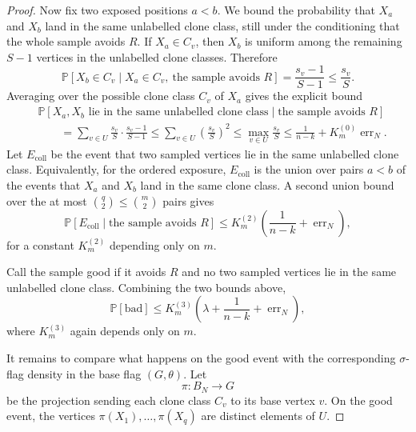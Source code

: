 \documentclass[11pt]{article}
\theoremstyle{definition}
\newcommand{\Prob}{\mathbb{P}}
\begin{document}
\begin{proof}
Now fix two exposed positions $a<b$.  We bound the probability that $X_a$ and
$X_b$ land in the same unlabelled clone class, still under the conditioning
that the whole sample avoids $R$.  If $X_a\in C_v$, then $X_b$ is uniform among
the remaining $S-1$ vertices in the unlabelled clone classes.  Therefore
\[
  \Prob[X_b\in C_v\mid X_a\in C_v,\ \text{the sample avoids }R]
  =
  \frac{s_v-1}{S-1}
  \le
  \frac{s_v}{S}.
\]
Averaging over the possible clone class $C_v$ of $X_a$ gives the explicit bound
\[
  \begin{aligned}
  &\Prob[X_a,X_b\text{ lie in the same unlabelled clone class}
        \mid \text{the sample avoids }R]  \\
  &\qquad =
  \sum_{v\in U}
    \frac{s_v}{S}\cdot\frac{s_v-1}{S-1}
  \le
  \sum_{v\in U}\left(\frac{s_v}{S}\right)^2
  \le
  \max_{v\in U}\frac{s_v}{S}
  \le
  \frac1{n-k}+K_m^{(0)}\operatorname{err}_N.
  \end{aligned}
\]
Let $E_{\mathrm{coll}}$ be the event that two sampled vertices
lie in the same unlabelled clone class.  Equivalently, for the ordered
exposure, $E_{\mathrm{coll}}$ is the union over pairs $a<b$ of the events that
$X_a$ and $X_b$ land in the same clone class.  A second union bound over the at
most $\binom q2\le\binom m2$ pairs gives
\[
  \Prob[E_{\mathrm{coll}}\mid \text{the sample avoids }R]
  \le
  K_m^{(2)}\left(\frac1{n-k}+\operatorname{err}_N\right),
\]
for a constant $K_m^{(2)}$ depending only on $m$.

Call the sample good if it avoids $R$ and no two sampled vertices lie in the same
unlabelled clone class.  Combining the two bounds above,
\[
  \Prob[\text{bad}]
  \le
  K_m^{(3)}\left(\lambda+\frac1{n-k}+\operatorname{err}_N\right),
\]
where $K_m^{(3)}$ again depends only on $m$.

It remains to compare what happens on the good event with the corresponding
$\sigma$-flag density in the base flag $(G,\theta)$.  Let
\[
  \pi:B_N\to G
\]
be the projection sending each clone class $C_v$ to its base vertex $v$.  On the
good event, the vertices $\pi(X_1),\ldots,\pi(X_q)$ are distinct elements of
$U$.


\end{proof}
\end{document}
